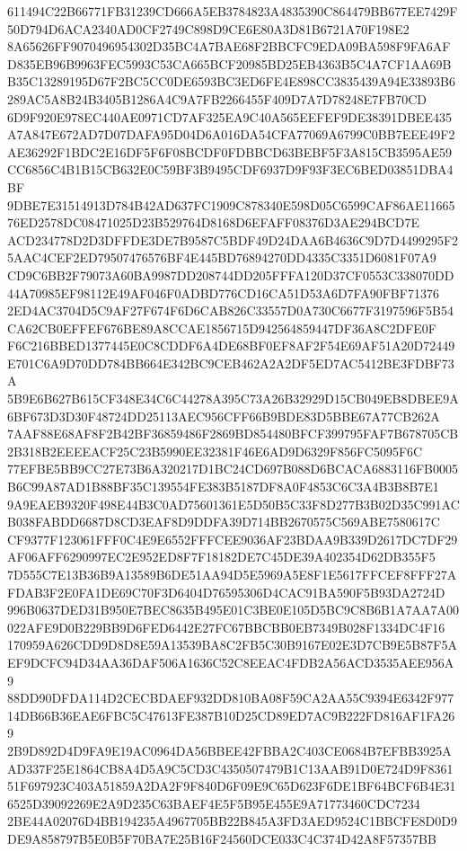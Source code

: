 \documentclass[UTF8,fontset=fandol,zihao=-4,a4paper]{ctexart}
\begin{document}
{{611494C22B66771FB31239CD666A5EB3784823A4835390C864479BB677EE7429F50D794D6ACA2340AD0CF2749C898D9CE6E80A3D81B6721A70F198E2
8A65626FF9070496954302D35BC4A7BAE68F2BBCFC9EDA09BA598F9FA6AFD835EB96B9963FEC5993C53CA665BCF20985BD25EB4363B5C4A7CF1AA69B
B35C13289195D67F2BC5CC0DE6593BC3ED6FE4E898CC3835439A94E33893B6289AC5A8B24B3405B1286A4C9A7FB2266455F409D7A7D78248E7FB70CD
6D9F920E978EC440AE0971CD7AF325EA9C40A565EEFEF9DE38391DBEE435A7A847E672AD7D07DAFA95D04D6A016DA54CFA77069A6799C0BB7EEE49F2
AE36292F1BDC2E16DF5F6F08BCDF0FDBBCD63BEBF5F3A815CB3595AE59CC6856C4B1B15CB632E0C59BF3B9495CDF6937D9F93F3EC6BED03851DBA4BF
9DBE7E31514913D784B42AD637FC1909C878340E598D05C6599CAF86AE1166576ED2578DC08471025D23B529764D8168D6EFAFF08376D3AE294BCD7E
ACD234778D2D3DFFDE3DE7B9587C5BDF49D24DAA6B4636C9D7D4499295F25AAC4CEF2ED79507476576BF4E445BD76894270DD4335C3351D6081F07A9
CD9C6BB2F79073A60BA9987DD208744DD205FFFA120D37CF0553C338070DD44A70985EF98112E49AF046F0ADBD776CD16CA51D53A6D7FA90FBF71376
2ED4AC3704D5C9AF27F674F6D6CAB826C33557D0A730C6677F3197596F5B54CA62CB0EFFEF676BE89A8CCAE1856715D942564859447DF36A8C2DFE0F
F6C216BBED1377445E0C8CDDF6A4DE68BF0EF8AF2F54E69AF51A20D72449E701C6A9D70DD784BB664E342BC9CEB462A2A2DF5ED7AC5412BE3FDBF73A
5B9E6B627B615CF348E34C6C44278A395C73A26B32929D15CB049EB8DBEE9A6BF673D3D30F48724DD25113AEC956CFF66B9BDE83D5BBE67A77CB262A
7AAF88E68AF8F2B42BF36859486F2869BD854480BFCF399795FAF7B678705CB2B318B2EEEEACF25C23B5990EE32381F46E6AD9D6329F856FC5095F6C
77EFBE5BB9CC27E73B6A320217D1BC24CD697B088D6BCACA6883116FB0005B6C99A87AD1B88BF35C139554FE383B5187DF8A0F4853C6C3A4B3B8B7E1
9A9EAEB9320F498E44B3C0AD75601361E5D50B5C33F8D277B3B02D35C991ACB038FABDD6687D8CD3EAF8D9DDFA39D714BB2670575C569ABE7580617C
CF9377F123061FFF0C4E9E6552FFFCEE9036AF23BDAA9B339D2617DC7DF29AF06AFF6290997EC2E952ED8F7F18182DE7C45DE39A402354D62DB355F5
7D555C7E13B36B9A13589B6DE51AA94D5E5969A5E8F1E5617FFCEF8FFF27AFDAB3F2E0FA1DE69C70F3D6404D76595306D4CAC91BA590F5B93DA2724D
996B0637DED31B950E7BEC8635B495E01C3BE0E105D5BC9C8B6B1A7AA7A00022AFE9D0B229BB9D6FED6442E27FC67BBCBB0EB7349B028F1334DC4F16
170959A626CDD9D8D8E59A13539BA8C2FB5C30B9167E02E3D7CB9E5B87F5AEF9DCFC94D34AA36DAF506A1636C52C8EEAC4FDB2A56ACD3535AEE956A9
88DD90DFDA114D2CECBDAEF932DD810BA08F59CA2AA55C9394E6342F97714DB66B36EAE6FBC5C47613FE387B10D25CD89ED7AC9B222FD816AF1FA269
2B9D892D4D9FA9E19AC0964DA56BBEE42FBBA2C403CE0684B7EFBB3925AAD337F25E1864CB8A4D5A9C5CD3C4350507479B1C13AAB91D0E724D9F8361
51F697923C403A51859A2DA2F9F840D6F09E9C65D623F6DE1BF64BCF6B4E316525D39092269E2A9D235C63BAEF4E5F5B95E455E9A71773460CDC7234
2BE44A02076D4BB194235A4967705BB22B845A3FD3AED9524C1BBCFE8D0D9DE9A858797B5E0B5F70BA7E25B16F24560DCE033C4C374D42A8F57357BB
}}
\end{document}
